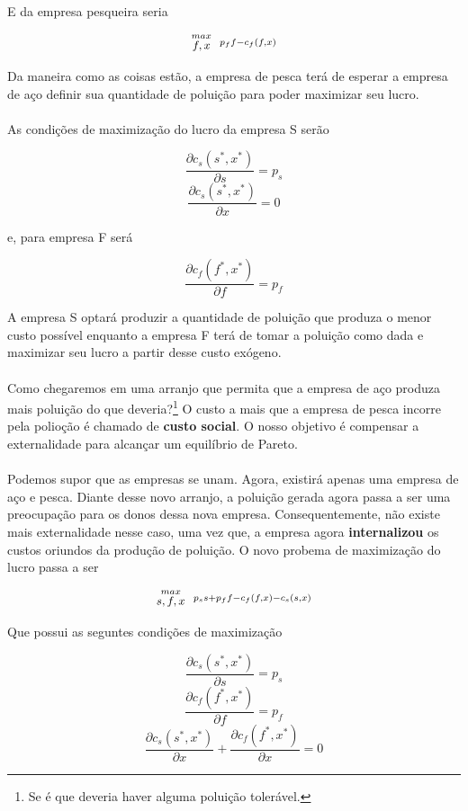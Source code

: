 \documentclass[a4paper,11pt,oneside]{book}
\theoremstyle{definition}
\theoremstyle{break}
\begin{document}
E da empresa pesqueira seria

\begin{center}
	\LARGE $$ \stackrel{max}{\text{\small $f,x$}} \ \ %
	\stackrel{p_f f - c_f(f,x)}{\ } $$ %
\end{center}

Da maneira como as coisas estão, a empresa de pesca terá de esperar a empresa de aço definir sua quantidade de poluição para poder maximizar seu lucro.
\\
\\
As condições de maximização do lucro da empresa S serão

$$ \frac{\partial c_s(s^*,x^*)}{\partial s} = p_s $$
$$ \frac{\partial c_s(s^*,x^*)}{\partial x} = 0 $$

e, para empresa F será

$$ \frac{\partial c_f(f^*,x^*)}{\partial f} = p_f $$

A empresa S optará produzir a quantidade de poluição que produza o menor custo possível enquanto a empresa F terá de tomar a poluição como dada e maximizar seu lucro a partir desse custo exógeno.
\\
\\
Como chegaremos em uma arranjo que permita que a empresa de aço produza mais poluição do que deveria?\footnote{Se é que deveria haver alguma poluição tolerável.} O custo a mais que a empresa de pesca incorre pela polioção é chamado de \textbf{custo social}. O nosso objetivo é compensar a externalidade para alcançar um equilíbrio de Pareto.
\\
\\
Podemos supor que as empresas se unam. Agora, existirá apenas uma empresa de aço e pesca. Diante desse novo arranjo, a poluição gerada agora passa a ser uma preocupação para os donos dessa nova empresa. Consequentemente, não existe mais externalidade nesse caso, uma vez que, a empresa agora \textbf{internalizou} os custos oriundos da produção de poluição. O novo probema de maximização do lucro passa a ser

\begin{center}
	\LARGE $$ \stackrel{max}{\text{\small $s,f,x$}} \ \ %
	\stackrel{p_s s + p_f f - c_f(f,x) - c_s(s,x)}{\ } $$ %
\end{center}

Que possui as seguntes condições de maximização

$$ \frac{\partial c_s(s^*,x^*)}{\partial s} = p_s $$
$$ \frac{\partial c_f(f^*,x^*)}{\partial f} = p_f $$
$$ \frac{\partial c_s(s^*,x^*)}{\partial x} + \frac{\partial c_f(f^*,x^*)}{\partial x}= 0 $$
\end{document}
